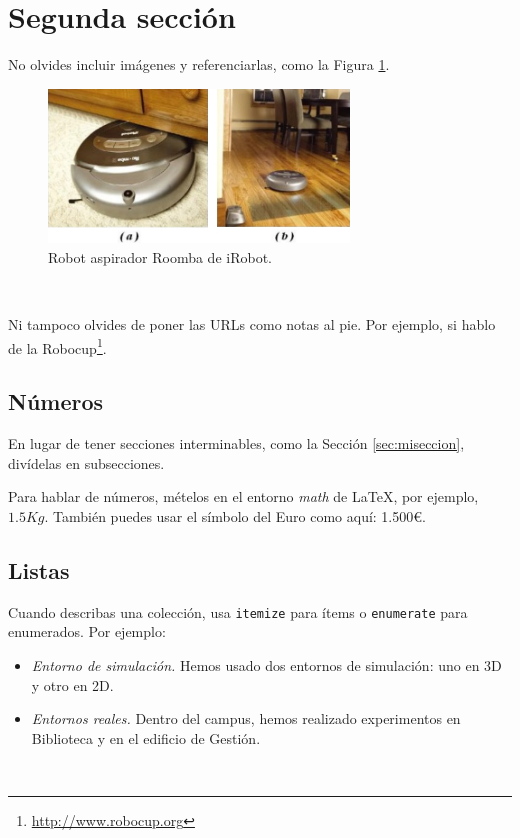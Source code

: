 \section{Segunda sección}
\label{sec:segundaseccion}

No olvides incluir imágenes y referenciarlas, como la Figura \ref{fig:roomba}.

\begin{figure} [h!]
  \begin{center}
    \includegraphics[width=8cm]{figs/roomba}
  \end{center}
  \caption{Robot aspirador Roomba de iRobot.}
  \label{fig:roomba}
\end{figure}\

Ni tampoco olvides de poner las URLs como notas al pie. Por ejemplo, si hablo de la Robocup\footnote{\url{http://www.robocup.org}}.

\subsection{Números}
\label{sec:subseccion}

En lugar de tener secciones interminables, como la Sección \ref{sec:miseccion}, divídelas en subsecciones.

Para hablar de números, mételos en el entorno \textit{math} de \LaTeX, por ejemplo, $1.5Kg$. También puedes usar el símbolo del Euro como aquí: 1.500\euro.

\subsection{Listas}

Cuando describas una colección, usa \texttt{itemize} para ítems o \texttt{enumerate} para enumerados. Por ejemplo:

\begin{itemize}
 \item \textit{Entorno de simulación.} Hemos usado dos entornos de simulación: uno en 3D y otro en 2D.
 \item \textit{Entornos reales.} Dentro del campus, hemos realizado experimentos en Biblioteca y en el edificio de Gestión.
\end{itemize}\

